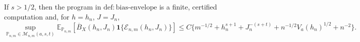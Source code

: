 If \(s>1/2\), then the program in \(\mathrm{def:bias\text{-}envelope}\) is a finite, certified computation and, for \(h=h_n\), \(J=J_n\),
\[
\sup_{\mathbb P_{n,m}\in\mathcal M_{n,m}(a,s,t)}
\mathbb E_{\mathbb P_{n,m}}\left[\overline B_X(h_n,J_n)\mathbf1\{\mathcal E_{n,m}(h_n,J_n)\}\right]
\le C\{m^{-1/2}+h_n^{s+1}+J_n^{-(s+t)}+n^{-1/2}V_a(h_n)^{1/2}+n^{-2}\}.
\]